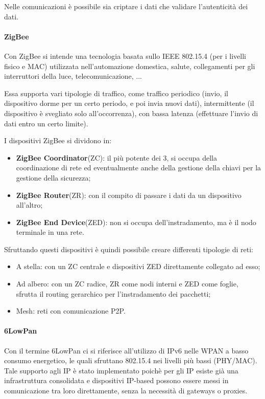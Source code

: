 Nelle comunicazioni è possibile sia criptare i dati che validare l'autenticità 
dei dati.

\paragraph{ZigBee}
Con ZigBee si intende una tecnologia basata sullo IEEE 802.15.4 (per i livelli 
fisico e MAC) utilizzata nell'automazione domestica, salute, collegamenti per 
gli interruttori della luce, telecomunicazione, ...

Essa supporta vari tipologie di traffico, come traffico periodico (invio, il 
dispositivo dorme per un certo periodo, e poi invia nuovi dati), intermittente 
(il dispositivo è svegliato solo all'occorrenza), con bassa latenza (effettuare
 l'invio di dati entro un certo limite). 

I dispositivi ZigBee si dividono in:
\begin{itemize}
  \item \textbf{ZigBee Coordinator}(ZC): il più potente dei 3, si occupa della 
        coordinazione di rete ed eventualmente anche della gestione della chiavi 
        per la gestione della sicurezza;
  \item \textbf{ZigBee Router}(ZR): con il compito di passare i dati da un 
        dispositivo all'altro;
  \item \textbf{ZigBee End Device}(ZED): non si occupa dell'instradamento, ma è 
        il nodo terminale in una rete.
\end{itemize}

Sfruttando questi dispositivi è quindi possibile creare differenti tipologie di 
reti:
\begin{itemize}
  \item A stella: con un ZC centrale e dispositivi ZED direttamente collegato ad 
        esso;
  \item Ad albero: con un ZC radice, ZR come nodi interni e ZED come foglie, 
        sfrutta il routing gerarchico per l'instradamento dei pacchetti;
  \item Mesh: reti con comunicazione P2P.
\end{itemize}

\paragraph{6LowPan}
Con il termine 6LowPan ci si riferisce all'utilizzo di IPv6 nelle WPAN a basso 
consumo energetico, le quali sfruttano 802.15.4 nei livelli più bassi (PHY/MAC). 
Tale supporto agli IP è stato implementato poichè per gli IP esiste già una 
infrastruttura consolidata e dispositivi IP-based possono essere messi in 
comunicazione tra loro direttamente, senza la necessità di gateways o proxies.

